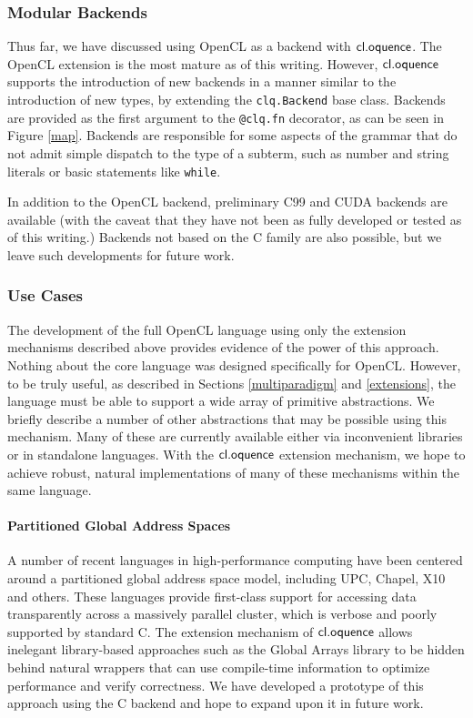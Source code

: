 \documentclass[10pt, conference, compsocconf]{IEEEtran}
\begin{document}
\subsubsection{Modular Backends}\label{backends}
Thus far, we have discussed using OpenCL as a backend with $\textsf{cl.oquence}$. The OpenCL extension is the most mature as of this writing. However, $\textsf{cl.oquence}$ supports the introduction of new backends in a manner similar to the introduction of new types, by extending the \verb|clq.Backend| base class. Backends are provided as the first argument to the \verb|@clq.fn| decorator, as can be seen in Figure \ref{map}. 
Backends are responsible for some aspects of the grammar that do not admit simple dispatch to the type of a subterm, such as number and string literals or basic statements like \verb|while|.

In addition to the OpenCL backend, preliminary C99 and CUDA backends are available (with the caveat that they have not been as fully developed or tested as of this writing.) Backends not based on the C family are also possible, but we leave such developments for future work.


\subsubsection{Use Cases}
The development of the full OpenCL language using only the extension mechanisms described above provides evidence of the power of this approach. Nothing about the core language was designed specifically for OpenCL. However, to be truly useful, as described in Sections \ref{multiparadigm} and  \ref{extensions}, the language must be able to support a wide array of primitive abstractions. We briefly describe a number of other abstractions that may be possible using this mechanism. Many of these are currently available either via inconvenient libraries or in standalone languages. With the $\textsf{cl.oquence}$ extension mechanism, we hope to achieve robust, natural implementations of many of these mechanisms within the same language.

\paragraph{Partitioned Global Address Spaces}
A number of recent languages in high-performance computing have been centered around a partitioned global address space model, including UPC, Chapel, X10 and others. These languages provide first-class support for accessing data transparently across a massively parallel cluster, which is verbose and poorly supported by standard C. The extension mechanism of $\textsf{cl.oquence}$ allows inelegant library-based approaches such as the Global Arrays library to be hidden behind natural wrappers that can use compile-time information to optimize performance and verify correctness. We have developed a prototype of this approach using the C backend and hope to expand upon it in future work.
\end{document}
